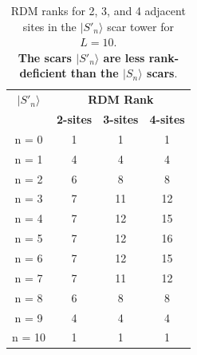 \documentclass[11pt]{article}
\begin{document}
\begin{itemize}
\begin{itemize}
	 \begin{table}[H]
	\centering
	\begin{tabular}{|c|ccc|}
	\hline
	\textbf{$|S'_n\rangle$} & \multicolumn{3}{c|}{\textbf{RDM Rank}} \\
	\cline{2-4}
	& \textbf{2-sites} & \textbf{3-sites} & \textbf{4-sites} \\
	\hline
          n = 0 & 1 & 1 & 1 \\
	 n = 1 & 4 & 4 & 4 \\
	 n = 2 & 6 & 8 & 8 \\
	 n = 3 & 7 & 11 & 12 \\
	 n = 4 & 7 & 12 & 15 \\  
	 n = 5 & 7 & 12 & 16 \\
	 n = 6 & 7 & 12 & 15 \\
	 n = 7 & 7 & 11 & 12 \\
	 n = 8 & 6 & 8 & 8 \\
	 n = 9 & 4 & 4 & 4 \\
	 n = 10 & 1 & 1 & 1 \\
	\hline
	\end{tabular}
	\caption{RDM ranks for 2, 3, and 4 adjacent sites in the $|S'_n\rangle$ scar tower for $L=10$.\\ \textbf{The scars $|S'_n\rangle$ are less rank-deficient than the $|S_n\rangle$ scars}.}
	\label{tab:ranks22}
	\end{table}
	

\end{itemize}
\end{itemize}
\end{document}
